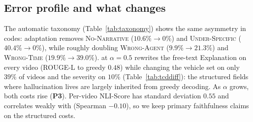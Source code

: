 \subsection{Error profile and what \tcd{} changes}
\label{sec:taxonomy-results}
\label{sec:tcd-changes}

The automatic taxonomy (Table~\ref{tab:taxonomy}) shows the same asymmetry in codes: adaptation removes \textsc{No-Narrative} ($10.6\%\to0\%$) and \textsc{Under-Specific} ($40.4\%\to0\%$), while roughly doubling \textsc{Wrong-Agent} ($9.9\%\to21.3\%$) and \textsc{Wrong-Time} ($19.9\%\to39.0\%$).
\tcd{} at $\alpha{=}0.5$ rewrites the free-text Explanation on every video (ROUGE-L to greedy $0.48$) while changing the vehicle set on only $39\%$ of videos and the severity on $10\%$ (Table~\ref{tab:tcddiff}): the structured fields where hallucination lives are largely inherited from greedy decoding.
As $\alpha$ grows, both costs rise (\textbf{P3}).
Per-video NLI-Score has standard deviation $0.55$ and correlates weakly with \Hcost{} (Spearman $-0.10$), so we keep primary faithfulness claims on the structured costs.
